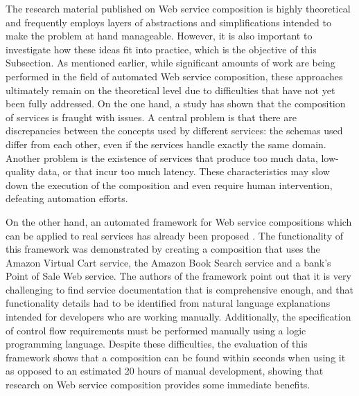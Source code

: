 The research material published on Web service composition is highly theoretical and frequently employs layers of abstractions and simplifications intended to make the problem at hand manageable. However, it is also important to investigate how these ideas fit into practice, which is the objective of this Subsection. As mentioned earlier, while significant amounts of work are being performed in the field of automated Web service composition, these approaches ultimately remain on the theoretical level due to difficulties that have not yet been fully addressed. On the one hand, a study \cite{lu2007web} has shown that the composition of services is fraught with issues. A central problem is that there are discrepancies between the concepts used by different services: the schemas used differ from each other, even if the services handle exactly the same domain. Another problem is the existence of services that produce too much data, low-quality data, or that incur too much latency. These characteristics may slow down the execution of the composition and even require human intervention, defeating automation efforts.

On the other hand, an automated framework for Web service compositions which can be applied to real services has already been proposed \cite{marconi2007automatedweb}.
The functionality of this framework was demonstrated by creating a composition that uses the Amazon Virtual Cart service, the Amazon
Book Search service and a bank's Point of Sale Web service. The authors of the framework point out that it is very challenging to find service documentation that is comprehensive enough, and that functionality details had to be identified from natural language explanations intended
for developers who are working manually. Additionally, the specification of control flow requirements must be performed manually using a logic programming language. Despite these difficulties, the evaluation of this framework shows that a composition can be found within seconds when using it as opposed to an estimated 20 hours of manual development, showing that research on Web service composition provides some immediate benefits.

